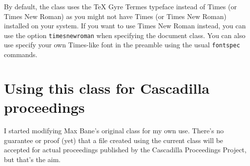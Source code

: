 \documentclass{cascadilla-xelatex-biblatex}
\begin{document}
By default, the class uses the TeX Gyre Termes typeface instead of Times (or
Times New Roman) as you might not have Times (or Times New Roman) installed on
your system. If you want to use Times New Roman instead, you can use the option
\texttt{timesnewroman} when specifying the document class. You can also use
specify your own Times-like font in the preamble using the usual
\texttt{fontspec} commands.

\section{Using this class for Cascadilla proceedings}

I started modifying Max Bane's original class for my own use. There's no
guarantee or proof (yet) that a file created using the current class will be
accepted for actual proceedings published by the Cascadilla Proceedings
Project, but that's the aim.

\printbibliography
\end{document}

